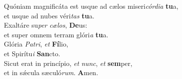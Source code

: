 \oddverse Quóniam magnificáta est usque ad cælos miseri\textit{cór}\textit{di}\textit{a} \textbf{tu}a,~\*\\
\oddverse et usque ad nubes véri\textit{tas} \textbf{tu}a.\\
\evenverse Exaltáre su\textit{per} \textit{cæ}\textit{los}, \textbf{De}us:~\*\\
\evenverse et super omnem terram glóri\textit{a} \textbf{tu}a.\\
\oddverse Glória \textit{Pa}\textit{tri}, \textit{et} \textbf{Fí}lio,~\*\\
\oddverse et Spirítu\textit{i} \textbf{San}cto.\\
\evenverse Sicut erat in princípio, \textit{et} \textit{nunc}, \textit{et} \textbf{sem}per,~\*\\
\evenverse et in sǽcula sæculó\textit{rum}. \textbf{A}men.\\
